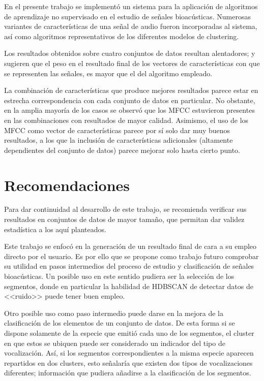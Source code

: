 En el presente trabajo se implementó un sistema para la aplicación de algoritmos de aprendizaje no supervisado en el estudio de señales bioacústicas.
Numerosas variantes de características de una señal de audio fueron incorporadas al sistema, así como algoritmos representativos de los diferentes modelos de clustering.

Los resultados obtenidos sobre cuatro conjuntos de datos resultan alentadores;
y sugieren que el peso en el resultado final de los vectores de características con que se representen las señales, es mayor que el del algoritmo empleado.

La combinación de características que produce mejores resultados parece estar en estrecha correspondencia con cada conjunto de datos en particular.
No obstante, en la amplia mayoría de los casos se observó que los MFCC estuvieron presentes en las combinaciones con resultados de mayor calidad.
Asimismo, el uso de los MFCC como vector de características parece por sí solo dar muy buenos resultados, a los que la inclusión de características adicionales (altamente dependientes del conjunto de datos) parece mejorar solo hasta cierto punto.

\section*{Recomendaciones}\label{sec:recomendaciones}

Para dar continuidad al desarrollo de este trabajo, se recomienda verificar sus resultados en conjuntos de datos de mayor tamaño, que permitan dar validez estadística a los aquí planteados.

Este trabajo se enfocó en la generación de un resultado final de cara a su empleo directo por el usuario.
Es por ello que se propone como trabajo futuro comprobar su utilidad en pasos intermedios del proceso de estudio y clasificación de señales bioacústicas.
Un posible uso en este sentido pudiera ser la selección de los segmentos, donde en particular la habilidad de HDBSCAN de detectar datos de <<ruido>> puede tener buen empleo.

Otro posible uso como paso intermedio puede darse en la mejora de la clasificación de los elementos de un conjunto de datos.
De esta forma si se dispone solamente de la especie que emitió cada uno de los segmentos, el cluster en que estos se ubiquen puede ser considerado un indicador del tipo de vocalización.
Así, si los segmentos correspondientes a la misma especie aparecen repartidos en dos clusters, esto señalaría que existen dos tipos de vocalizaciones diferentes;
información que pudiera añadirse a la clasificación de los segmentos.
